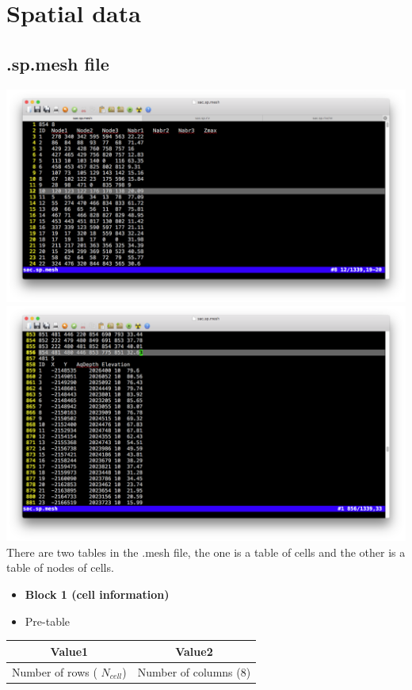 \documentclass[]{scrbook}
\begin{document}
\section{Spatial data}\label{spatial-data}

\subsection{.sp.mesh file}\label{sp.mesh-file}

\includegraphics{Fig/IO/sp.mesh1.png}
\includegraphics{Fig/IO/sp.mesh2.png} There are two tables in the .mesh
file, the one is a table of cells and the other is a table of nodes of
cells.

\begin{itemize}
\item
  \textbf{Block 1 (cell information)}
\item
  Pre-table
\end{itemize}

\begin{longtable}[]{@{}cc@{}}
\toprule
Value1 & Value2\tabularnewline
\midrule
\endhead
Number of rows ( \(N_{cell}\)) & Number of columns
(\(8\))\tabularnewline
\bottomrule
\end{longtable}
\end{document}
